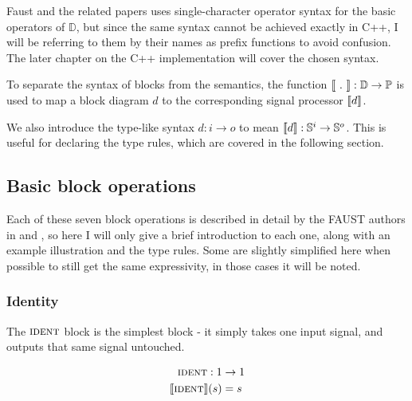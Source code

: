\begin{description}
        Faust and the related papers\autocite{orlarey2002,orlarey2004} uses single-character operator syntax for the basic
        operators of $\mathbb D$, but since the same syntax cannot be achieved exactly in C++, I will be
        referring to them by their names as prefix functions to avoid confusion. The later chapter on the C++
        implementation will cover the chosen syntax.

        To separate the syntax of blocks from the semantics, the function $\llbracket \ .\  \rrbracket : \mathbb D
          \rightarrow \mathbb P$ is used to map a
        block diagram $d$ to the corresponding signal processor $\llbracket d \rrbracket$.

        We also introduce the type-like syntax $d : i \rightarrow o$ to mean $\llbracket d \rrbracket : \mathbb{S}^i \rightarrow \mathbb{S}^o$. This is useful
        for declaring the type rules, which are covered in the following section.
\end{description}

\subsection{Basic block operations}
Each of these seven block operations is described in detail by the FAUST authors in \autocite{orlarey2002}
and \autocite{orlarey2004}, so here I will only give a brief introduction to each one, along with an example
illustration and the type rules. Some are slightly simplified here when possible to still get the same
expressivity, in those cases it will be noted.

\subsubsection{Identity}
The $\textsc{ident}$ block is the simplest block - it simply takes one input signal, and outputs that
same signal untouched.

\begin{minipage}{0.5\linewidth}
  \begin{align*}
    \textsc{ident}: 1        & \rightarrow 1 \\
    \llbracket \textsc{ident} \rrbracket(s) & = s
  \end{align*}
\end{minipage}
\begin{minipage}{0.5\linewidth}
  \begin{figure}[H]
    \centering
    \label{fig:block_ident}
    
  \end{figure}
\end{minipage}

